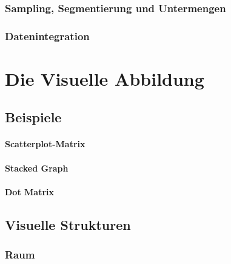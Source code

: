             \subsubsection{Sampling, Segmentierung und Untermengen} %

            \subsubsection{Datenintegration} %

    \section{Die Visuelle Abbildung} %

        \subsection{Beispiele} %

                \paragraph{Scatterplot-Matrix} %

                \paragraph{Stacked Graph} %

                \paragraph{Dot Matrix} %

        \subsection{Visuelle Strukturen} %

            \subsubsection{Raum} %

